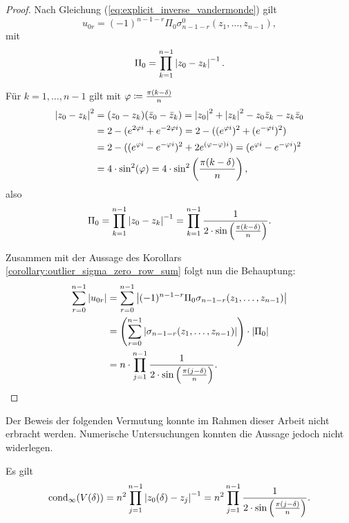 \begin{proof}
    Nach Gleichung (\ref{eq:explicit_inverse_vandermonde}) gilt
    \[
        u_{0r} = (-1)^{n-1-r} \Pi_0 \sigma_{n-1-r}^{0}(z_1, \dots, z_{n-1}),
    \]
    mit
    \[
        \Pi_0 = \prod_{k=1}^{n-1} \abs{ z_0 - z_k }^{-1}.
    \]

    \noindent Für $k = 1,\dots,n-1$ gilt mit $\varphi \defeq \frac{\pi (k - \delta)}{n}$
    \[
        \begin{split}
            \abs{z_0 - z_k}^2
            &= (z_0 - z_k) (\conj{z}_0 - \conj{z}_k)
            = \abs{z_0}^2 + \abs{z_k}^2 - z_0\conj{z}_k - z_k\conj{z}_0\\
            &= 2 - (e^{2 \varphi i} + e^{-2 \varphi i})
            = 2 - ((e^{\varphi i})^2 + (e^{-\varphi i})^2)\\
            &= 2 - ( (e^{\varphi i} - e^{-\varphi i})^2 + 2 e^{(\varphi - \varphi) i})
            = (e^{\varphi i} - e^{-\varphi i})^2\\
            &= 4 \cdot \sin^2 (\varphi)
            = 4 \cdot \sin^2 \left( \frac{\pi (k-\delta)}{n} \right),
        \end{split}
    \]
    also
    \[
        \Pi_0
        = \prod_{\substack{k = 1}}^{n-1} \abs{ z_0 - z_k }^{-1}
        = \prod_{\substack{k = 1}}^{n-1} \frac{1}{2 \cdot \sin \left( \frac{\pi (k-\delta)}{n} \right)}.
    \]

    \noindent Zusammen mit der Aussage des Korollars \ref{corollary:outlier_sigma_zero_row_sum} folgt nun die Behauptung:
    \[
        \begin{split}
            \sum_{r=0}^{n-1} \abs{ u_{0r} }
            &= \sum_{r=0}^{n-1} \abs{ (-1)^{n-1-r} \Pi_0 \sigma_{n-1-r}(z_1, \dots, z_{n-1}) }\\
            &= \left( \sum_{r=0}^{n-1} \abs{ \sigma_{n-1-r}(z_1, \dots, z_{n-1}) } \right) \cdot \abs{\Pi_0}\\
            &= n \cdot \prod_{j=1}^{n-1} \frac{1}{2 \cdot \sin \left(\frac{\pi (j - \delta)}{n} \right)}.
        \end{split}
    \]
\end{proof}

Der Beweis der folgenden Vermutung konnte im Rahmen dieser Arbeit nicht
erbracht werden. Numerische Untersuchungen konnten die Aussage jedoch nicht
widerlegen.

\begin{assumption}
    Es gilt
    \begin{equation}
        \cond[\infty]{ \Vand{\delta} }
        = n^2 \prod_{j=1}^{n-1} \abs{ z_0(\delta) - z_j }^{-1}
        = n^2 \prod_{j=1}^{n-1} \frac{1}{2 \cdot \sin \left(\frac{\pi (j - \delta)}{n} \right)}.
    \end{equation}
\end{assumption}


